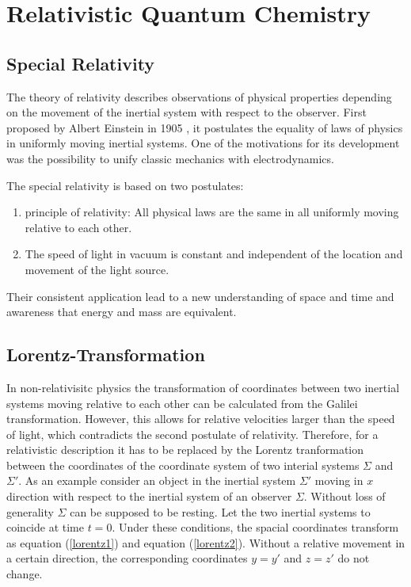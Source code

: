 \chapter{Relativistic Quantum Chemistry}
\section{Special Relativity}

The theory of relativity describes observations of physical properties
depending on the movement
of the inertial system with respect to the observer.
First proposed
by Albert Einstein in 1905 \cite{Einstein05}, it postulates the equality of
laws of physics in uniformly moving inertial systems.
One of the motivations for its development was the possibility to unify
classic mechanics with electrodynamics.

The special relativity is based on two postulates:
\begin{enumerate}
\item principle of relativity: All physical laws are the same in all uniformly
      moving relative to each other.
\item The speed of light in vacuum is constant and independent of the location
      and movement of the light source.
\end{enumerate}

Their consistent application lead to a new understanding of space and time
and awareness that energy and mass are equivalent.\cite{nolting4}


\section{Lorentz-Transformation}
In non-relativisitc physics the transformation of coordinates between two
inertial systems moving relative to each other can be calculated from the
Galilei transformation. However, this allows for relative velocities larger
than the speed of light, which contradicts the second postulate of relativity.
Therefore, for a relativistic description it has to be replaced by the Lorentz
tranformation between the coordinates of the coordinate system of two interial
systems $\Sigma$ and $\Sigma'$.
As an example consider an object in the inertial system $\Sigma'$ moving
in $x$ direction with respect to the inertial system of an observer $\Sigma$.
Without loss of generality $\Sigma$ can be supposed to be resting.
Let the two 
inertial systems to coincide at time $t=0$. Under these conditions, the spacial
coordinates transform as equation (\ref{lorentz1}) and equation (\ref{lorentz2}).
Without a relative movement in a certain direction, the corresponding coordinates
$y=y'$ and $z=z'$ do not change.

